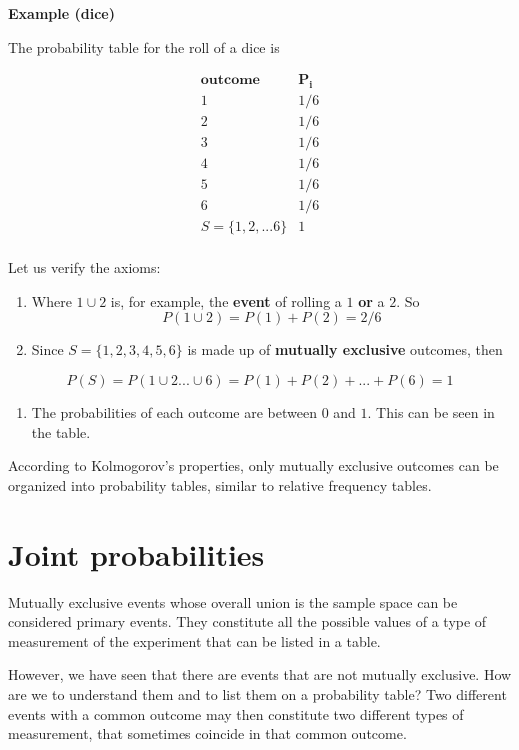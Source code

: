 \documentclass[
]{book}
\providecommand{\tightlist}{%
  \setlength{\itemsep}{0pt}\setlength{\parskip}{0pt}}
\begin{document}
\textbf{Example (dice)}

The probability table for the roll of a dice is

\[
\begin{array}{cc}
\mathbf{outcome}  & \mathbf{P_i} \\
1  & 1/6 \\
2  & 1/6 \\
3  & 1/6 \\
4  & 1/6 \\
5  & 1/6 \\
6  & 1/6 \\ \hline
S=\{1, 2, ... 6\} & 1 \\ 
\end{array}
\]

Let us verify the axioms:

\begin{enumerate}
\def\labelenumi{\arabic{enumi})}
\item
  Where \(1 \cup 2\) is, for example, the \textbf{event} of rolling a \(1\) \textbf{or} a \(2\). So \[ P( 1 \cup 2)=P(1)+P(2)=2/6\]
\item
  Since \(S= \{ 1,2,3,4,5,6\}\) is made up of \textbf{mutually exclusive} outcomes, then
\end{enumerate}

\[P(S)=P(1\cup 2 ... \cup 6) = P(1)+P(2)+ ...+P(6)=1\]

\begin{enumerate}
\def\labelenumi{\arabic{enumi})}
\setcounter{enumi}{2}
\tightlist
\item
  The probabilities of each outcome are between \(0\) and \(1\). This can be seen in the table.
\end{enumerate}

According to Kolmogorov's properties, only mutually exclusive outcomes can be organized into probability tables, similar to relative frequency tables.

\hypertarget{joint-probabilities}{%
\section{Joint probabilities}\label{joint-probabilities}}

Mutually exclusive events whose overall union is the sample space can be considered primary events. They constitute all the possible values of a type of measurement of the experiment that can be listed in a table.

However, we have seen that there are events that are not mutually exclusive. How are we to understand them and to list them on a probability table? Two different events with a common outcome may then constitute two different types of measurement, that sometimes coincide in that common outcome.
\end{document}
